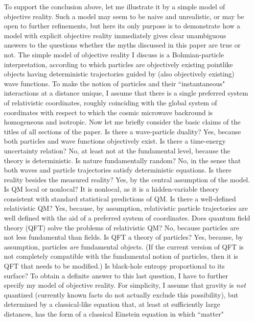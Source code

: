 \documentclass[12pt]{article}
\begin{document}
To support the conclusion above, let me illustrate it by a simple 
model of objective reality. Such a model may seem to be 
naive and unrealistic, or may be open to further refinements, 
but here its only purpose is to demonstrate how a
model with explicit objective reality immediately gives clear
unambiguous answers to the questions whether the myths discussed 
in this paper are true or not. The simple model of objective reality  
I discuss is a Bohmian-particle interpretation, according to which 
particles are objectively existing pointlike objects having deterministic 
trajectories guided by (also objectively existing) wave functions.
To make the notion of particles and their ``instantaneous" interactions
at a distance unique, I assume that there is a single preferred system of 
relativistic coordinates, roughly coinciding with the global system 
of coordinates with respect to which the cosmic microwave backround 
is homogeneous and isotropic. Now let me briefly consider the basic claims
of the titles of all sections of the paper.
Is there a wave-particle duality? Yes, because both particles and wave
functions 
objectively exist. Is there a time-energy uncertainty relation? No,
at least not at the fundamental level, because the theory is 
deterministic. Is nature fundamentally 
random? No, in the sense that both waves and particle trajectories satisfy 
deterministic equations. Is there reality besides the measured reality?
Yes, by the central assumption of the model. 
Is QM local or nonlocal? It is nonlocal,
as it is a hidden-variable theory consistent with standard 
statistical predictions of QM.
Is there a well-defined relativistic QM? Yes, because, by assumption, 
relativistic particle trajectories are well defined with the aid of a 
preferred system of coordinates. Does quantum field theory (QFT) 
solve the problems of relativistic QM? No, because particles are 
not less fundamental than fields. Is QFT a theory of particles?
Yes, because, by assumption, particles {\em are} fundamental
objects. (If the current version of QFT is not completely compatible 
with the fundamental notion of particles, then it is QFT that 
needs to be modified.) 
Is black-hole entropy proportional to its surface? To obtain 
a definite answer to this last question, I have to further specify 
my model of objective reality. For simplicity, I assume that
gravity is {\em not} quantized (currently known facts
do not actually exclude this possibility), but determined
by a classical-like equation that, at least at sufficiently large
distances, has the form of a classical Einstein equation in which ``matter" 
\end{document}
